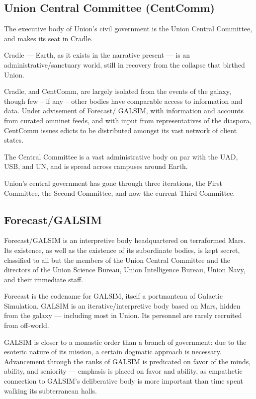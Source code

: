 \subsection{Union Central Committee (CentComm)}

The executive body of Union’s civil government is the Union Central Committee, and makes its
seat in Cradle.

Cradle — Earth, as it exists in the narrative present — is an administrative/sanctuary world, still
in recovery from the collapse that birthed Union.

Cradle, and CentComm, are largely isolated from the events of the galaxy, though few -- if any --
other bodies have comparable access to information and data. Under advisement of Forecast/
GALSIM, with information and accounts from curated omninet feeds, and with input from
representatives of the diaspora, CentComm issues edicts to be distributed amongst its vast
network of client states.

The Central Committee  is a vast administrative body on par with the UAD, USB, and UN, and is
spread across campuses around Earth.

Union’s central government has gone through three iterations, the First Committee, the Second
Committee, and now the current Third Committee.

\subsection{Forecast/GALSIM}

Forecast/GALSIM is an interpretive body headquartered on terraformed Mars. Its existence, as
well as the existence of its subordinate bodies, is kept secret, classified to all but the members of
the Union Central Committee and the directors of the Union Science Bureau, Union Intelligence
Bureau, Union Navy, and their immediate staff.

Forecast is the codename for GALSIM, itself a portmanteau of Galactic Simulation. GALSIM is an
iterative/interpretive body based on Mars, hidden from the galaxy — including most in Union. Its
personnel are rarely recruited from off-world.

GALSIM is closer to a monastic order than a branch of government: due to the esoteric nature of
its mission, a certain dogmatic approach is necessary. Advancement through the ranks of
GALSIM is predicated on favor of the minds, ability, and seniority — emphasis is placed on favor
and ability, as empathetic connection to GALSIM’s deliberative body is more important than time
spent walking its subterranean halls.

